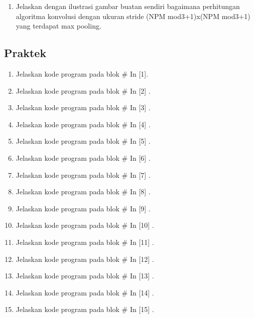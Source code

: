 \begin{enumerate}
\item Jelaskan dengan ilustrasi gambar buatan sendiri bagaimana perhitungan algoritma konvolusi dengan ukuran stride (NPM mod3+1)x(NPM mod3+1) yang terdapat max pooling.

\end{enumerate}





\subsection{Praktek}
\begin{enumerate}
\item Jelaskan kode program pada blok \# In [1]. 

\item Jelaskan kode program pada blok \# In [2] .

\item Jelaskan kode program pada blok \# In [3] .

\item Jelaskan kode program pada blok \# In [4] .

\item Jelaskan kode program pada blok \# In [5] .

\item Jelaskan kode program pada blok \# In [6] .

\item Jelaskan kode program pada blok \# In [7] .

\item Jelaskan kode program pada blok \# In [8] .

\item Jelaskan kode program pada blok \# In [9] .

\item Jelaskan kode program pada blok \# In [10] .

\item Jelaskan kode program pada blok \# In [11] .

\item Jelaskan kode program pada blok \# In [12] .

\item Jelaskan kode program pada blok \# In [13] .

\item Jelaskan kode program pada blok \# In [14] .

\item Jelaskan kode program pada blok \# In [15] .


\end{enumerate}
